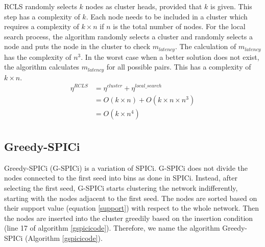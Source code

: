 \documentclass[times]{dacauth}
\begin{document}
\smallskip
RCLS randomly selects $k$ nodes as cluster heads, provided that $k$ is given. This step has a complexity of $k$. Each node needs to be included in a cluster which requires a complexity of $k\times n$ if $n$ is the total number of nodes. For the local search process, the algorithm randomly selects a cluster and randomly selects a node and puts the node in the cluster to check $m_{latency}$. The calculation of $m_{latency}$ has the complexity of $n^3$. In the worst case when a better solution does not exist, the algorithm calculates $m_{latency}$ for all possible pairs. This has a complexity of $k\times n$.
\begin{equation}
\begin{split}
\eta^{RCLS} &= \eta^{cluster} + \eta^{local\_search} \\
&= O(k\times n) + O(k\times n \times n^3) \\
&= O(k\times n^4) \\
\end{split}
\end{equation}

\subsection{Greedy-SPICi}
Greedy-SPICi (G-SPICi) is a variation of SPICi. G-SPICi does not divide the nodes connected to the first seed into bins as done in SPICi. Instead, after selecting the first seed, G-SPICi starts clustering the network indifferently, starting with the nodes adjacent to the first seed. The nodes are sorted based on their support value (equation \ref{support}) with respect to the whole network. Then the nodes are inserted into the cluster greedily based on the insertion condition (line 17 of algorithm \ref{gspicicode}). Therefore, we name the algorithm Greedy-SPICi (Algorithm \ref{gspicicode}).
\end{document}

